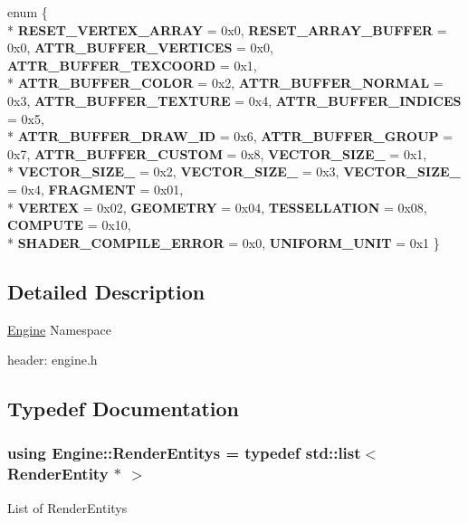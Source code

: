 \begin{DoxyCompactItemize}
\item 
\hypertarget{namespaceEngine_a2e8a78defebb530b5e5e3e1325bfa55c}{}enum \{ \\*
{\bfseries R\+E\+S\+E\+T\+\_\+\+V\+E\+R\+T\+E\+X\+\_\+\+A\+R\+R\+A\+Y} = 0x0, 
{\bfseries R\+E\+S\+E\+T\+\_\+\+A\+R\+R\+A\+Y\+\_\+\+B\+U\+F\+F\+E\+R} = 0x0, 
{\bfseries A\+T\+T\+R\+\_\+\+B\+U\+F\+F\+E\+R\+\_\+\+V\+E\+R\+T\+I\+C\+E\+S} = 0x0, 
{\bfseries A\+T\+T\+R\+\_\+\+B\+U\+F\+F\+E\+R\+\_\+\+T\+E\+X\+C\+O\+O\+R\+D} = 0x1, 
\\*
{\bfseries A\+T\+T\+R\+\_\+\+B\+U\+F\+F\+E\+R\+\_\+\+C\+O\+L\+O\+R} = 0x2, 
{\bfseries A\+T\+T\+R\+\_\+\+B\+U\+F\+F\+E\+R\+\_\+\+N\+O\+R\+M\+A\+L} = 0x3, 
{\bfseries A\+T\+T\+R\+\_\+\+B\+U\+F\+F\+E\+R\+\_\+\+T\+E\+X\+T\+U\+R\+E} = 0x4, 
{\bfseries A\+T\+T\+R\+\_\+\+B\+U\+F\+F\+E\+R\+\_\+\+I\+N\+D\+I\+C\+E\+S} = 0x5, 
\\*
{\bfseries A\+T\+T\+R\+\_\+\+B\+U\+F\+F\+E\+R\+\_\+\+D\+R\+A\+W\+\_\+\+I\+D} = 0x6, 
{\bfseries A\+T\+T\+R\+\_\+\+B\+U\+F\+F\+E\+R\+\_\+\+G\+R\+O\+U\+P} = 0x7, 
{\bfseries A\+T\+T\+R\+\_\+\+B\+U\+F\+F\+E\+R\+\_\+\+C\+U\+S\+T\+O\+M} = 0x8, 
{\bfseries V\+E\+C\+T\+O\+R\+\_\+\+S\+I\+Z\+E\+\_} = 0x1, 
\\*
{\bfseries V\+E\+C\+T\+O\+R\+\_\+\+S\+I\+Z\+E\+\_} = 0x2, 
{\bfseries V\+E\+C\+T\+O\+R\+\_\+\+S\+I\+Z\+E\+\_} = 0x3, 
{\bfseries V\+E\+C\+T\+O\+R\+\_\+\+S\+I\+Z\+E\+\_} = 0x4, 
{\bfseries F\+R\+A\+G\+M\+E\+N\+T} = 0x01, 
\\*
{\bfseries V\+E\+R\+T\+E\+X} = 0x02, 
{\bfseries G\+E\+O\+M\+E\+T\+R\+Y} = 0x04, 
{\bfseries T\+E\+S\+S\+E\+L\+L\+A\+T\+I\+O\+N} = 0x08, 
{\bfseries C\+O\+M\+P\+U\+T\+E} = 0x10, 
\\*
{\bfseries S\+H\+A\+D\+E\+R\+\_\+\+C\+O\+M\+P\+I\+L\+E\+\_\+\+E\+R\+R\+O\+R} = 0x0, 
{\bfseries U\+N\+I\+F\+O\+R\+M\+\_\+\+U\+N\+I\+T} = 0x1
 \}\label{namespaceEngine_a2e8a78defebb530b5e5e3e1325bfa55c}

\end{DoxyCompactItemize}


\subsection{Detailed Description}
\hyperlink{namespaceEngine}{Engine} Namespace

header\+: engine.\+h 

\subsection{Typedef Documentation}
\hypertarget{namespaceEngine_a2ca5f163e84c4bc8fe4bd444a3e03a3a}{}
\subsubsection[{Render\+Entitys}]{\setlength{\rightskip}{0pt plus 5cm}using {\bf Engine\+::\+Render\+Entitys} = typedef std\+::list$<$ {\bf Render\+Entity} $\ast$ $>$}\label{namespaceEngine_a2ca5f163e84c4bc8fe4bd444a3e03a3a}
List of Render\+Entitys 